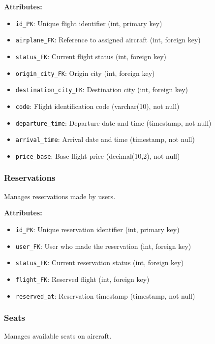 \documentclass[conference]{IEEEtran}
\begin{document}
    \textbf{Attributes:}
    \begin{itemize}
        \item \texttt{id\_PK}: Unique flight identifier (int, primary key)
        \item \texttt{airplane\_FK}: Reference to assigned aircraft (int, foreign key)
        \item \texttt{status\_FK}: Current flight status (int, foreign key)
        \item \texttt{origin\_city\_FK}: Origin city (int, foreign key)
        \item \texttt{destination\_city\_FK}: Destination city (int, foreign key)
        \item \texttt{code}: Flight identification code (varchar(10), not null)
        \item \texttt{departure\_time}: Departure date and time (timestamp, not null)
        \item \texttt{arrival\_time}: Arrival date and time (timestamp, not null)
        \item \texttt{price\_base}: Base flight price (decimal(10,2), not null)
    \end{itemize}

    \subsubsection{Reservations}
    Manages reservations made by users.

    \textbf{Attributes:}
    \begin{itemize}
        \item \texttt{id\_PK}: Unique reservation identifier (int, primary key)
        \item \texttt{user\_FK}: User who made the reservation (int, foreign key)
        \item \texttt{status\_FK}: Current reservation status (int, foreign key)
        \item \texttt{flight\_FK}: Reserved flight (int, foreign key)
        \item \texttt{reserved\_at}: Reservation timestamp (timestamp, not null)
    \end{itemize}

    \subsubsection{Seats}
    Manages available seats on aircraft.
\end{document}
